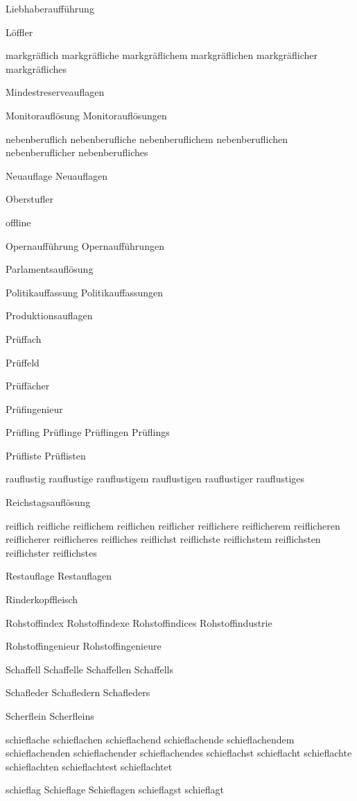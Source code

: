 Liebhaberaufführung 

Löffler

markgräflich markgräfliche markgräflichem markgräflichen markgräflicher markgräfliches

Mindestreserveauflagen

Monitorauflösung Monitorauflösungen

nebenberuflich nebenberufliche nebenberuflichem nebenberuflichen nebenberuflicher nebenberufliches

Neuauflage Neuauflagen

Oberstufler

offline

Opernaufführung Opernaufführungen

Parlamentsauflösung

Politikauffassung Politikauffassungen

Produktionsauflagen

Prüffach 

Prüffeld

Prüffächer

Prüfingenieur

Prüfling Prüflinge Prüflingen Prüflings

Prüfliste Prüflisten

rauflustig rauflustige rauflustigem rauflustigen rauflustiger rauflustiges

Reichstagsauflösung

reiflich reifliche reiflichem reiflichen reiflicher reiflichere reiflicherem reiflicheren reiflicherer reiflicheres reifliches reiflichst reiflichste reiflichstem reiflichsten reiflichster reiflichstes

Restauflage Restauflagen

Rinderkopffleisch

Rohstoffindex Rohstoffindexe Rohstoffindices Rohstoffindustrie

Rohstoffingenieur Rohstoffingenieure

Schaffell Schaffelle Schaffellen Schaffells

Schafleder Schafledern Schafleders

Scherflein Scherfleins

schieflache schieflachen schieflachend schieflachende schieflachendem schieflachenden schieflachender schieflachendes schieflachst schieflacht schieflachte schieflachten schieflachtest schieflachtet

schieflag Schieflage Schieflagen schieflagst schieflagt

